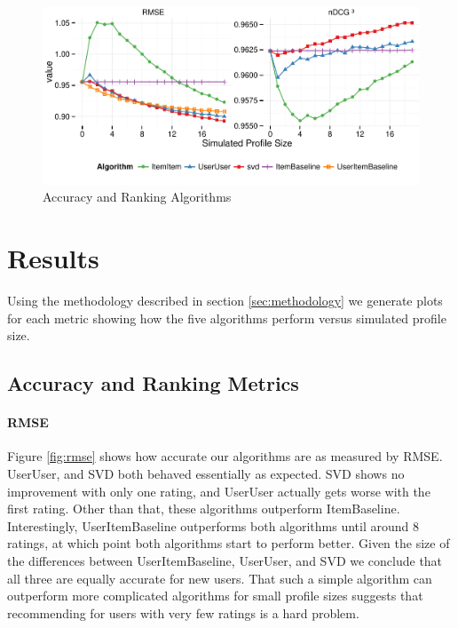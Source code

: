 \documentclass[letterpaper]{sig-alternate}
\begin{document}
\begin{figure}[ht!]
  \centering
  \includegraphics[width=0.75\linewidth]{../lenskit/output/ekstrandTuned20/accuracy.pdf}
  \caption{Accuracy and Ranking Algorithms}
  \label{fig:rmse}
  \label{fig:ndcg}
\end{figure}

\pagebreak
\section{Results}

  Using the methodology described in section \ref{sec:methodology} we generate plots for each metric showing how the five algorithms perform versus simulated profile size.


  
\subsection*{Accuracy and Ranking Metrics}

\vspace{-1.5em}
 
  \paragraph{RMSE}
  Figure \ref{fig:rmse} shows how accurate our algorithms are as measured by RMSE.
  UserUser, and SVD both behaved essentially as expected.
  SVD shows no improvement with only one rating, and UserUser actually gets worse with the first rating.
  Other than that, these algorithms outperform ItemBaseline.
  Interestingly, UserItemBaseline outperforms both algorithms until around 8 ratings, at which point both algorithms start to perform better.
  Given the size of the differences between UserItemBaseline, UserUser, and SVD we conclude that all three are equally accurate for new users.
  That such a simple algorithm can outperform more complicated algorithms for small profile sizes suggests that recommending for users with very few ratings is a hard problem.
  
\end{document}
